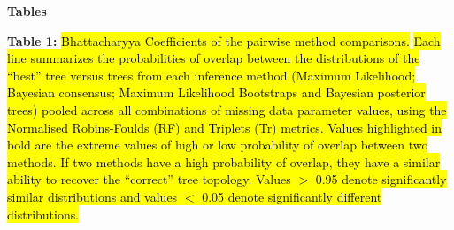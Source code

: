 \documentclass[12pt,letterpaper]{article}
\begin{document}
\newpage
\begin{landscape}

\noindent
\textbf{Tables}\\
\bigskip

\noindent
\textbf{Table 1:} \hl{Bhattacharyya Coefficients of the pairwise method comparisons.}
\hl{Each line summarizes the probabilities of overlap between the distributions of the ``best'' tree versus trees from each inference method (Maximum Likelihood; Bayesian consensus; Maximum Likelihood Bootstraps and Bayesian posterior trees) pooled across all combinations of missing data parameter values, using the Normalised Robins-Foulds (RF) and Triplets (Tr) metrics. 
Values highlighted in bold are the extreme values of high or low probability of overlap between two methods. If two methods have a high probability of overlap, they have a similar ability to recover the ``correct'' tree topology.
Values $>$ 0.95 denote significantly similar distributions and values $<$ 0.05 denote significantly different distributions.}\\


\end{landscape}
\end{document}

